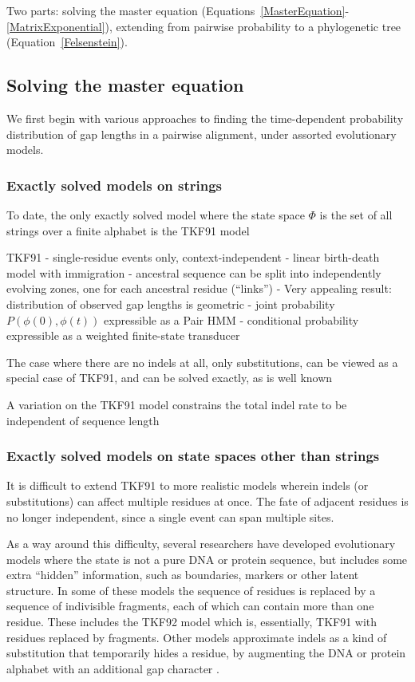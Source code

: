 \documentclass{bmcart}
\newcommand{\eqref}[1]{Equation~\ref{#1}}
\newcommand{\statespace}{\Phi}
\newcommand{\state}{\phi}
\begin{document}
Two parts:
solving the master equation (Equations~\ref{MasterEquation}-\ref{MatrixExponential}),
extending from pairwise probability to a phylogenetic tree (\eqref{Felsenstein}).

\subsection*{Solving the master equation}

We first begin with various approaches to finding the time-dependent probability distribution
of gap lengths in a pairwise alignment,
under assorted evolutionary models.

\subsubsection*{Exactly solved models on strings}

To date, the only exactly solved model where the state space $\statespace$
is the set of all strings over a finite alphabet
is the TKF91 model \cite{ThorneEtal91}

TKF91
 - single-residue events only, context-independent
 - linear birth-death model with immigration
 - ancestral sequence can be split into independently evolving zones, one for each ancestral residue (``links'')
 - Very appealing result: distribution of observed gap lengths is geometric
 - joint probability $P(\state(0),\state(t))$ expressible as a Pair HMM \cite{HolmesBruno2001}
 - conditional probability expressible as a weighted finite-state transducer \cite{Holmes2003,WestessonEtAl2012,BouchardCote2013}

The case where there are no indels at all, only substitutions, can be viewed as a special case of TKF91,
and can be solved exactly, as is well known

A variation on the TKF91 model constrains the total indel rate to be independent of sequence
length \cite{BouchardCoteJordan2013}

\subsubsection*{Exactly solved models on state spaces other than strings}

It is difficult to extend TKF91 to more realistic models wherein indels (or substitutions)
can affect multiple residues at once.
The fate of adjacent residues is no longer independent, since a single event can span multiple sites.

As a way around this difficulty, several researchers have developed
evolutionary models where the state is not a pure DNA or protein sequence,
but includes some extra ``hidden'' information,
such as boundaries, markers or other latent structure.
In some of these models the sequence of residues is replaced by a sequence of indivisible fragments,
each of which can contain more than one residue\cite{ThorneEtal92,Metzler2003,RivasEddy2015}.
These includes the TKF92 model\cite{ThorneEtal92} which is, essentially, TKF91 with residues replaced by
fragments.
Other models approximate indels as a kind of substitution that temporarily hides a residue,
by augmenting the DNA or protein alphabet with an additional gap character \cite{Rivas05,RivasEddy2008}.
\end{document}
